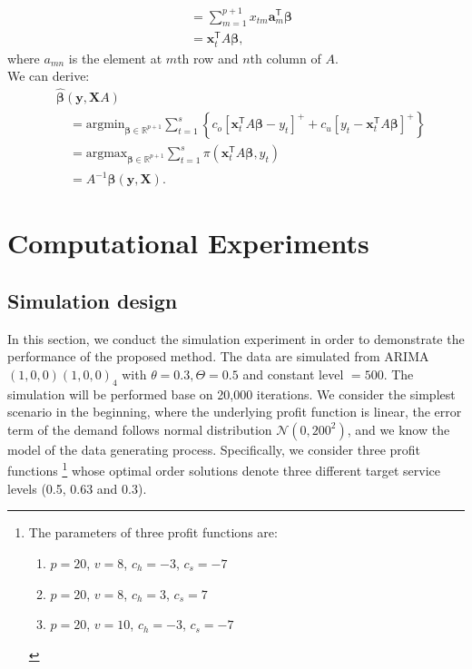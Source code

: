 \documentclass{article}
\begin{document}
\begin{itemize}
\[\begin{aligned}
            &=\displaystyle\sum_{m=1}^{p+1}x_{tm}\mathbf{a}_m^{\mathsf{T}}\boldsymbol{\beta}\\
            &=\mathbf{x}_t^{\mathsf{T}}A\boldsymbol{\beta},
        \end{aligned}
    \]
    where $a_{mn}$ is the element at $m$th row and $n$th column of $A$.\\
    We can derive:
    \[
        \begin{aligned}
            &\hat{\boldsymbol{\beta}}(\mathbf{y},\mathbf{X}A)\\
            &\quad=\text{argmin}_{\boldsymbol{\beta}\in \mathbb{R}^{p+1}}\displaystyle\sum_{t=1}^s{\left\{c_o\left[\mathbf{x}_t^{\mathsf{T}}A\boldsymbol{\beta}-y_t\right]^{+}+c_u\left[y_t-\mathbf{x}_t^{\mathsf{T}}A\boldsymbol{\beta}\right]^{+}\right\}}\\
            &\quad=\text{argmax}_{\boldsymbol{\beta}\in \mathbb{R}^{p+1}}\displaystyle\sum_{t=1}^s{\pi(\mathbf{x}_t^{\mathsf{T}}A\boldsymbol{\beta},y_t)}\\
            &\quad=A^{-1}\hat{\boldsymbol{\beta}}(\mathbf{y},\mathbf{X}).
        \end{aligned}
    \]
    
\end{itemize}



\section{Computational Experiments} \label{se:results}

\subsection{Simulation design}

In this section, we conduct the simulation experiment in order to demonstrate the performance of the proposed method. The data are simulated from ARIMA $(1,0,0)(1,0,0)_4$ with $\theta=0.3,\Theta=0.5$ and constant level $=500$. The simulation will be performed base on 20,000 iterations. We consider the simplest scenario in the beginning, where the underlying profit function is linear, the error term of the demand follows normal distribution $\mathcal{N}(0,200^2)$, and we know the model of the data generating process. Specifically, we consider three profit functions \footnote{
The parameters of three profit functions are:
\begin{enumerate}
    \item $p=20$, $v=8$, $c_h=-3$, $c_s=-7$
    \item $p=20$, $v=8$, $c_h=3$, $c_s=7$
    \item $p=20$, $v=10$, $c_h=-3$, $c_s=-7$
\end{enumerate}
} whose optimal order solutions denote three different target service levels (0.5, 0.63 and 0.3).
\end{document}
